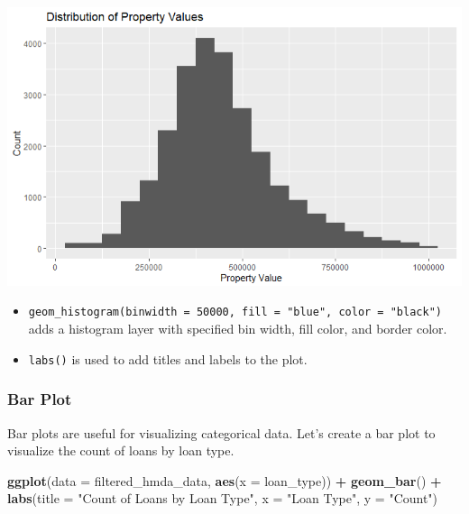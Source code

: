 \documentclass[
]{book}
\newenvironment{Shaded}{\begin{snugshade}}{\end{snugshade}}
\newcommand{\AttributeTok}[1]{\textcolor[rgb]{0.13,0.29,0.53}{#1}}
\newcommand{\FunctionTok}[1]{\textcolor[rgb]{0.13,0.29,0.53}{\textbf{#1}}}
\newcommand{\NormalTok}[1]{#1}
\newcommand{\SpecialCharTok}[1]{\textcolor[rgb]{0.81,0.36,0.00}{\textbf{#1}}}
\newcommand{\StringTok}[1]{\textcolor[rgb]{0.31,0.60,0.02}{#1}}
\providecommand{\tightlist}{%
  \setlength{\itemsep}{0pt}\setlength{\parskip}{0pt}}
\begin{document}
\includegraphics{images/histogram_plot.PNG}

\begin{itemize}
\tightlist
\item
  \texttt{geom\_histogram(binwidth\ =\ 50000,\ fill\ =\ "blue",\ color\ =\ "black")} adds a histogram layer with specified bin width, fill color, and border color.
\item
  \texttt{labs()} is used to add titles and labels to the plot.
\end{itemize}

\hypertarget{bar-plot}{%
\subsubsection*{Bar Plot}\label{bar-plot}}

Bar plots are useful for visualizing categorical data. Let's create a bar plot to visualize the count of loans by loan type.

\begin{Shaded}
\begin{Highlighting}[]
\FunctionTok{ggplot}\NormalTok{(}\AttributeTok{data =}\NormalTok{ filtered\_hmda\_data, }\FunctionTok{aes}\NormalTok{(}\AttributeTok{x =}\NormalTok{ loan\_type)) }\SpecialCharTok{+}
  \FunctionTok{geom\_bar}\NormalTok{() }\SpecialCharTok{+}
  \FunctionTok{labs}\NormalTok{(}\AttributeTok{title =} \StringTok{"Count of Loans by Loan Type"}\NormalTok{,}
       \AttributeTok{x =} \StringTok{"Loan Type"}\NormalTok{,}
       \AttributeTok{y =} \StringTok{"Count"}\NormalTok{)}
\end{Highlighting}
\end{Shaded}
\end{document}
